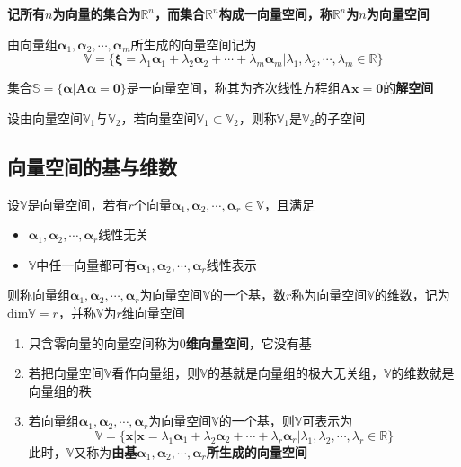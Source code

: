\documentclass[UTF8]{ctexart}
\newcommand{\ve}[1]{{\bm{#1}}}
\newcommand{\mat}[1]{\ve{#1}}
\newcommand{\set}[1]{{\mathbb{#1}}}
\newcommand{\emplin}{\vspace{1em}}
\begin{document}
\textbf{记所有$n$为向量的集合为$\set{R}^n$，而集合$\set{R}^n$构成一向量空间，称$\set{R}^n$为$n$为向量空间}

\emplin

由向量组$\mat{\alpha}_1,\mat{\alpha}_2,\cdots,\mat{\alpha}_m$所生成的向量空间记为
\[\set{V}=\{ \mat{\xi}=\lambda_1\mat{\alpha}_1+\lambda_2\mat{\alpha}_2+\cdots+\lambda_m\mat{\alpha}_m|\lambda_1,\lambda_2,\cdots,\lambda_m\in\set{R} \}\]

\emplin

集合$\set{S}=\{ \mat{\alpha}|\mat{A}\mat{\alpha}=\mat{0} \}$是一向量空间，称其为齐次线性方程组$\mat{A}\mat{x}=\mat{0}$的\textbf{解空间}

\emplin
\emplin

设由向量空间$\set{V}_1$与$\set{V}_2$，若向量空间$\set{V}_1\subset\set{V}_2$，则称$\set{V}_1$是$\set{V}_2$的子空间

\subsection*{向量空间的基与维数}
设$\set{V}$是向量空间，若有$r$个向量$\mat{\alpha}_1,\mat{\alpha}_2,\cdots,\mat{\alpha}_r\in\set{V}$，且满足
\begin{itemize}
  \item $\mat{\alpha}_1,\mat{\alpha}_2,\cdots,\mat{\alpha}_r$线性无关
  \item $\set{V}$中任一向量都可有$\mat{\alpha}_1,\mat{\alpha}_2,\cdots,\mat{\alpha}_r$线性表示
\end{itemize}
则称向量组$\mat{\alpha}_1,\mat{\alpha}_2,\cdots,\mat{\alpha}_r$为向量空间$\set{V}$的一个基，数$r$称为向量空间$\set{V}$的维数，记为
$\text{dim}\set{V}=r$，并称$\set{V}$为$r$维向量空间

\begin{enumerate}
  \item 只含零向量的向量空间称为\textbf{$0$维向量空间}，它没有基
  \item 若把向量空间$\set{V}$看作向量组，则$\set{V}$的基就是向量组的极大无关组，$\set{V}$的维数就是向量组的秩
  \item 若向量组$\mat{\alpha}_1,\mat{\alpha}_2,\cdots,\mat{\alpha}_r$为向量空间$\set{V}$的一个基，则$\set{V}$可表示为
  \[\set{V}=\{ \mat{x}|\mat{x}=\lambda_1\mat{\alpha}_1+\lambda_2\mat{\alpha}_2+\cdots+\lambda_r\mat{\alpha}_r|\lambda_1,\lambda_2,\cdots,\lambda_r\in\set{R} \}\]
  此时，$\set{V}$又称为\textbf{由基$\mat{\alpha}_1,\mat{\alpha}_2,\cdots,\mat{\alpha}_r$所生成的向量空间}
\end{enumerate}
\end{document}
